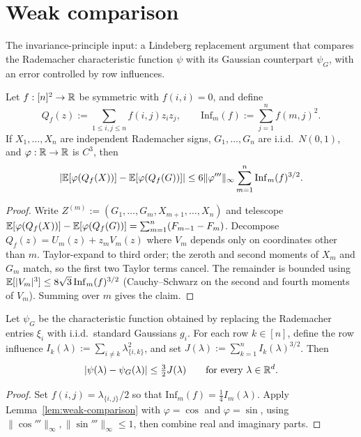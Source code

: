 \chapter{Weak comparison}
\label{chap:weak-comparison}

The invariance-principle input: a Lindeberg replacement argument that
compares the Rademacher characteristic function $\psi$ with its Gaussian
counterpart $\psi_G$, with an error controlled by row influences.

\begin{lemma}\label{lem:weak-comparison}
\leanok
Let $f:[n]^2\to\mathbb{R}$ be symmetric with $f(i,i)=0$, and define
\[
  Q_f(z):=\sum_{1\le i,j\le n}f(i,j)z_i z_j,
  \qquad
  \mathrm{Inf}_m(f):=\sum_{j=1}^n f(m,j)^2.
\]
If $X_1,\dots,X_n$ are independent Rademacher signs,
$G_1,\dots,G_n$ are i.i.d.\ $N(0,1)$, and
$\varphi:\mathbb{R}\to\mathbb{R}$ is $C^3$, then
\[
  \left|\mathbb{E}[\varphi(Q_f(X))]-\mathbb{E}[\varphi(Q_f(G))]\right|
  \le 6\|\varphi'''\|_\infty \sum_{m=1}^n \mathrm{Inf}_m(f)^{3/2}.
\]
\end{lemma}

\begin{proof}\leanok
Write $Z^{(m)}:=(G_1,\dots,G_m,X_{m+1},\dots,X_n)$ and telescope
$\mathbb{E}[\varphi(Q_f(X))]-\mathbb{E}[\varphi(Q_f(G))]
=\sum_{m=1}^n(F_{m-1}-F_m)$.
Decompose $Q_f(z)=U_m(z)+z_mV_m(z)$ where $V_m$ depends only on
coordinates other than $m$.
Taylor-expand to third order; the zeroth and second moments of $X_m$
and $G_m$ match, so the first two Taylor terms cancel.
The remainder is bounded using $\mathbb{E}[|V_m|^3]\le 8\sqrt3\,\mathrm{Inf}_m(f)^{3/2}$
(Cauchy--Schwarz on the second and fourth moments of $V_m$).
Summing over $m$ gives the claim.
\end{proof}

\begin{corollary}\label{cor:weak-comparison}
\leanok
{}
Let $\psi_G$ be the characteristic function obtained by replacing the
Rademacher entries $\xi_i$ with i.i.d.\ standard Gaussians $g_i$.
For each row $k\in[n]$, define the row influence
$I_k(\lambda):=\sum_{i\ne k}\lambda_{\{i,k\}}^2$, and set
$J(\lambda):=\sum_{k=1}^n I_k(\lambda)^{3/2}$. Then
\[
  |\psi(\lambda)-\psi_G(\lambda)|\le \tfrac32 J(\lambda)
  \qquad\text{for every }\lambda\in\mathbb{R}^d.
\]
\end{corollary}

\begin{proof}\leanok
{}
Set $f(i,j)=\lambda_{\{i,j\}}/2$ so that
$\mathrm{Inf}_m(f)=\tfrac14 I_m(\lambda)$.
Apply Lemma~\ref{lem:weak-comparison} with $\varphi=\cos$ and $\varphi=\sin$,
using $\|\cos'''\|_\infty,\|\sin'''\|_\infty\le 1$, then combine
real and imaginary parts.
\end{proof}
